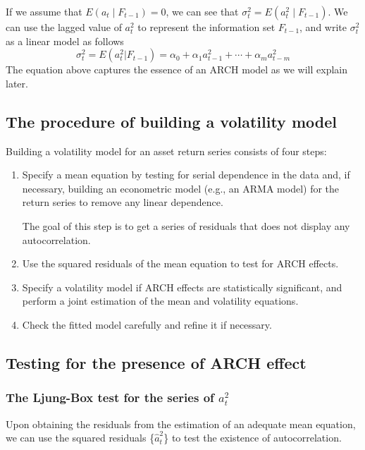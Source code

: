 \documentclass[a4paper,11pt]{article}
\begin{document}
If we assume that \(E(a_t \mid F_{t-1}) = 0\), we can see that
\(\sigma^2_t = E(a^2_t \mid F_{t-1})\). We can use the lagged value of
\(a^2_t\) to represent the information set \(F_{t-1}\), and write
\(\sigma^2_t\) as a linear model as follows
\[ \sigma^2_t = E(a^2_t | F_{t-1}) = \alpha_0 + \alpha_1 a^2_{t-1} +
\cdots + \alpha_m a^2_{t-m} \]
The equation above captures the essence of an ARCH model as we will
explain later.

\subsection{The procedure of building a volatility model}
\label{sec:org32e6f93}

Building a volatility model for an asset return series consists of
four steps:

\begin{enumerate}
\item Specify a mean equation by testing for serial dependence in the
data and, if necessary, building an econometric model (e.g., an
ARMA model) for the return series to remove any linear dependence.

The goal of this step is to get a series of residuals that does not
display any autocorrelation.

\item Use the squared residuals of the mean equation to test for ARCH
effects.

\item Specify a volatility model if ARCH effects are statistically
significant, and perform a joint estimation of the mean and
volatility equations.

\item Check the fitted model carefully and refine it if necessary.
\end{enumerate}


\subsection{Testing for the presence of ARCH effect}
\label{sec:org5095325}

\subsubsection{The Ljung-Box test for the series of \(a^2_t\)}
\label{sec:org76c0a28}

Upon obtaining the residuals from the estimation
of an adequate mean equation, we can use the squared residuals
\{\(\hat{a}_t^2\)\} to test the existence of autocorrelation.
\end{document}
